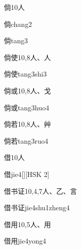 \begin{Entry}{倘}{10}{⼈}
  \begin{Phonetics}{倘}{chang2}
  \end{Phonetics}
  \begin{Phonetics}{倘}{tang3}
  \end{Phonetics}
\end{Entry}

\begin{Entry}{倘使}{10,8}{⼈、⼈}
  \begin{Phonetics}{倘使}{tang3shi3}
  \end{Phonetics}
\end{Entry}

\begin{Entry}{倘或}{10,8}{⼈、⼽}
  \begin{Phonetics}{倘或}{tang3huo4}
  \end{Phonetics}
\end{Entry}

\begin{Entry}{倘若}{10,8}{⼈、⾋}
  \begin{Phonetics}{倘若}{tang3ruo4}
  \end{Phonetics}
\end{Entry}

\begin{Entry}{借}{10}{⼈}
  \begin{Phonetics}{借}{jie4}[][HSK 2]
  \end{Phonetics}
\end{Entry}

\begin{Entry}{借书证}{10,4,7}{⼈、⼄、⾔}
  \begin{Phonetics}{借书证}{jie4shu1zheng4}
  \end{Phonetics}
\end{Entry}

\begin{Entry}{借用}{10,5}{⼈、⽤}
  \begin{Phonetics}{借用}{jie4yong4}
  \end{Phonetics}
\end{Entry}

